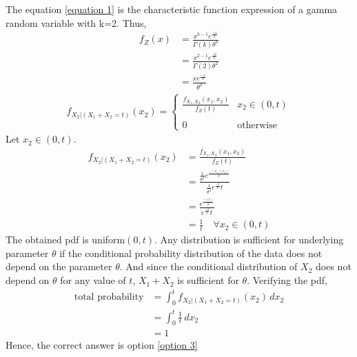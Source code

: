 \documentclass[journal,12pt,twocolumn]{IEEEtran}
\begin{document}
The equation \eqref{equation 1} is the characteristic function expression of a gamma random variable with k=2. Thus,
\begin{align}
    f_Z(x) &= \frac{x^{k-1}e^{\frac{-x}{\theta}}}{\Gamma(k)\theta^k}
    \\ &=  \frac{x^{2-1}e^{\frac{-x}{\theta}}}{\Gamma(2)\theta^2}
    \\ &= \frac{xe^{\frac{-x}{\theta}}}{\theta^2}
\end{align}
\begin{align}
    f_{X_2|(X_1+X_2=t)}(x_2) = 
    \begin{cases}
    \frac{f_{X_1,X_2}(x_1,x_2)}{f_Z(t)} &  x_2 \in (0, t)\\ ~\\[-1em]
    0 & \text{otherwise}
    \end{cases}
\end{align}
Let $ x_2 \in (0, t)$.
\begin{align}
    f_{X_2|(X_1+X_2=t)}(x_2) &= \frac{f_{X_1,X_2}(x_1,x_2)}{f_Z(t)}
    \\&= \frac{\frac{1}{\theta^2}e^{\frac{-(x_1+x_2)}{\theta}}}{\frac{1}{\theta^2}e^{\frac{-t}{\theta}}t}
    \\&= \frac{e^{\frac{-(t)}{\theta}}}{e^{\frac{-t}{\theta}}t}
    \\&= \frac{1}{t} \quad \forall x_2 \in (0, t)
\end{align}
The obtained pdf is uniform$(0,t)$. Any distribution is sufficient for underlying parameter $\theta$ if the conditional probability distribution of the data does not depend on the parameter $\theta$.  And since the conditional distribution of $X_2$ does not depend on $\theta$ for any value of $t$, $X_1+X_2$ is sufficient for $\theta$. Verifying the pdf,
\begin{align}
    \text{total probability} &= \int_{0}^{t} f_{X_2|(X_1+X_2=t)}(x_2) \,dx_2
    \\&= \int_{0}^{t} \frac{1}{t} \,dx_2
    \\&= 1
\end{align}
Hence, the correct answer is option \eqref{option 3}
\end{document}
